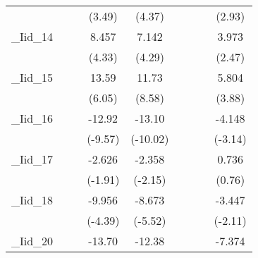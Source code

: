 {\begin{tabular}{l*{8}{c}}
            &                     &                     &      (3.49)         &      (4.37)         &                     &                     &                     &      (2.93)         \\
[1em]
\_Iid\_14     &                     &                     &       8.457\sym{***}&       7.142\sym{***}&                     &                     &                     &       3.973\sym{*}  \\
            &                     &                     &      (4.33)         &      (4.29)         &                     &                     &                     &      (2.47)         \\
[1em]
\_Iid\_15     &                     &                     &       13.59\sym{***}&       11.73\sym{***}&                     &                     &                     &       5.804\sym{***}\\
            &                     &                     &      (6.05)         &      (8.58)         &                     &                     &                     &      (3.88)         \\
[1em]
\_Iid\_16     &                     &                     &      -12.92\sym{***}&      -13.10\sym{***}&                     &                     &                     &      -4.148\sym{**} \\
            &                     &                     &     (-9.57)         &    (-10.02)         &                     &                     &                     &     (-3.14)         \\
[1em]
\_Iid\_17     &                     &                     &      -2.626         &      -2.358\sym{*}  &                     &                     &                     &       0.736         \\
            &                     &                     &     (-1.91)         &     (-2.15)         &                     &                     &                     &      (0.76)         \\
[1em]
\_Iid\_18     &                     &                     &      -9.956\sym{***}&      -8.673\sym{***}&                     &                     &                     &      -3.447\sym{*}  \\
            &                     &                     &     (-4.39)         &     (-5.52)         &                     &                     &                     &     (-2.11)         \\
[1em]
\_Iid\_20     &                     &                     &      -13.70\sym{***}&      -12.38\sym{***}&                     &                     &                     &      -7.374\sym{***}\\

\end{tabular}}
